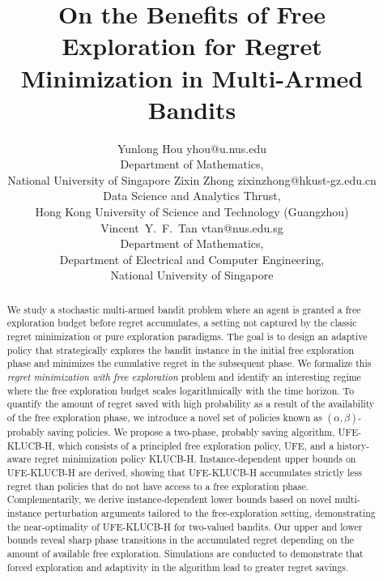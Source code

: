 \documentclass[twoside,11pt]{article}
\newcommand{\ouralg}{\textsc{UFE-KLUCB-H}}
\newcommand{\ouralgfe}{\textsc{UFE}}
\newcommand{\klucbh}{\textsc{KLUCB-H}}
\begin{document}
\title{On the Benefits of Free Exploration for Regret Minimization in Multi-Armed Bandits}

\author{\name Yunlong Hou \email yhou@u.nus.edu \\
       \addr Department of Mathematics,\\ National University of Singapore
       \AND
       \name Zixin Zhong \email zixinzhong@hkust-gz.edu.cn \\
       \addr Data Science and Analytics Thrust, \\ Hong Kong University of Science and Technology (Guangzhou)
       \AND
       \name Vincent~Y.~F.~Tan \email vtan@nus.edu.sg \\
       \addr  Department of Mathematics,\\ Department of Electrical and Computer Engineering, \\ National University of Singapore}


\maketitle

\begin{abstract}%
    We study a  stochastic multi-armed bandit problem where an agent is granted a free exploration budget before regret accumulates, a setting not captured by the classic regret minimization or pure exploration paradigms. 
    The goal is to design an adaptive policy that strategically explores the bandit instance in the initial  free exploration phase and minimizes the cumulative regret in the subsequent phase.
    We formalize this \emph{regret minimization with free exploration} problem and identify an interesting regime where the free exploration budget scales logarithmically with the time horizon.
    To quantify the amount of regret saved with high probability as a result of the availability of the free exploration phase, we introduce a novel set of policies known as  $(\alpha,\beta)$-probably saving policies. 
    We propose a two-phase, probably saving algorithm, \ouralg{}, which consists of a principled free exploration policy, \ouralgfe{}, and a history-aware regret minimization policy \klucbh{}. 
   Instance-dependent upper bounds on  \ouralg{} are derived, showing
that  \ouralg{} accumulates strictly less regret than policies that do not have access
to a free exploration phase. Complementarily, we derive instance-dependent lower bounds
based on novel multi-instance perturbation arguments tailored to the free-exploration
setting, demonstrating the near-optimality of  \ouralg{} for two-valued bandits.
Our upper and lower bounds reveal sharp phase transitions in the accumulated regret
depending on the amount of available free exploration.
    Simulations are conducted to demonstrate that forced exploration and adaptivity in the algorithm lead to greater regret savings.
\end{abstract}
\end{document}
